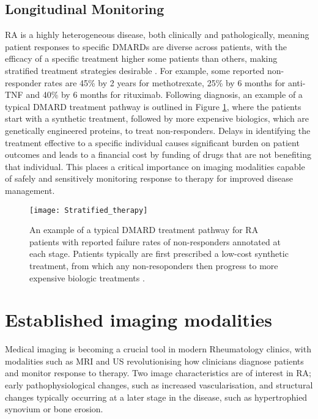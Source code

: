 \documentclass[twoside]{bhamthesis}
\theoremstyle{definition}
\begin{document}

\subsection{Longitudinal Monitoring}
\label{Longitudinal Monitoring of Response to Therapy}

RA is a highly heterogeneous disease, both clinically and pathologically, meaning patient responses to specific DMARDs are diverse across patients, with the efficacy of a specific treatment higher some patients than others, making stratified treatment strategies desirable \cite{barton2016stratified}. For example, some reported non-responder rates are 45\% by 2 years for methotrexate, 25\% by 6 months for anti-TNF and 40\% by 6 months for rituximab\cite{barrera2002drug,hyrich2006predictors,soliman2011impact}. Following diagnosis, an example of a typical DMARD treatment pathway is outlined in Figure \ref{fig:strat_therapy}, where the patients start with a synthetic treatment, followed by more expensive biologics, which are genetically engineered proteins, to treat non-responders. Delays in identifying the treatment effective to a specific individual causes significant burden on patient outcomes and leads to a financial cost by funding of drugs that are not benefiting that individual. This places a critical importance on imaging modalities capable of safely and sensitively monitoring response to therapy for improved disease management.

\begin{figure}[!ht]
\centering\texttt{[image: Stratified\_therapy]}
\caption{An example of a typical DMARD treatment pathway for RA patients with reported failure rates of non-responders annotated at each stage. Patients typically are first prescribed a low-cost synthetic treatment, from which any non-resoponders then progress to more expensive biologic treatments \cite{barrera2002drug,hyrich2006predictors,soliman2011impact}.}
  \label{fig:strat_therapy}
\end{figure}

\section{Established imaging modalities}

Medical imaging is becoming a crucial tool in modern Rheumatology clinics, with modalities such as MRI and US revolutionising how clinicians diagnose patients and monitor response to therapy. Two image characteristics are of interest in RA; early pathophysiological changes, such as increased vascularisation, and structural changes typically occurring at a later stage in the disease, such as hypertrophied synovium or bone erosion. 
\end{document}
